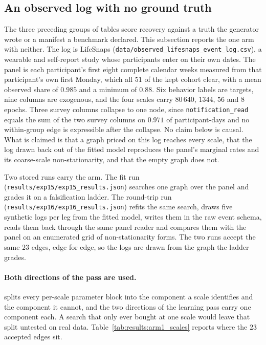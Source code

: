 \subsection{An observed log with no ground truth}
\label{sec:results:arm1}

The three preceding groups of tables score recovery against a truth the
generator wrote or a manifest a benchmark declared. This subsection reports the
one arm with neither. The log is LifeSnaps
(\texttt{data/observed\_lifesnaps\_event\_log.csv}), a wearable and
self-report study whose participants enter on their own dates. The panel is
each participant's first eight complete calendar weeks measured from that
participant's own first Monday, which all $51$ of the kept cohort clear, with a
mean observed share of $0.985$ and a minimum of $0.88$. Six behavior labels are
targets, nine columns are exogenous, and the four scales carry $80\,640$,
$1344$, $56$ and $8$ epochs. Three survey columns collapse to one node, since
\texttt{notification\_read} equals the sum of the two survey columns on
$0.971$ of participant-days and no within-group edge is expressible after the
collapse. No claim below is causal. What is claimed is that a graph priced on
this log reaches every scale, that the log drawn back out of the fitted model
reproduces the panel's marginal rates and its coarse-scale non-stationarity,
and that the empty graph does not.

Two stored runs carry the arm. The fit run
(\texttt{results/exp15/exp15\_results.json}) searches one graph over the panel
and grades it on a falsification ladder. The round-trip run
(\texttt{results/exp16/exp16\_results.json}) refits the same search, draws five
synthetic logs per leg from the fitted model, writes them in the raw event
schema, reads them back through the same panel reader and compares them with
the panel on an enumerated grid of non-stationarity forms. The two runs accept
the same $23$ edges, edge for edge, so the logs are drawn from the graph the
ladder grades.

\paragraph{Both directions of the pass are used.}
 splits every per-scale parameter block into
the component a scale identifies and the component it cannot, and the two
directions of the learning pass carry one component each. A search that only
ever bought at one scale would leave that split untested on real data.
Table~\ref{tab:results:arm1_scales} reports where the $23$ accepted edges sit.

